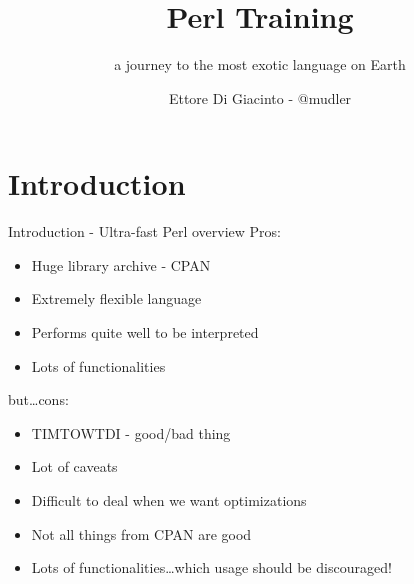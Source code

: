 \documentclass[10pt]{beamer}
\title{Perl Training}
\subtitle{a journey to the most exotic language on Earth}
\date{}
\author{Ettore Di Giacinto - @mudler}
\institute{SUSE/Gentoo/Sabayon}
\begin{document}
\maketitle
\begin{frame}[fragile]
\end{frame}

\section{Introduction}
\begin{frame}[fragile]{Introduction - Ultra-fast Perl overview}
    Pros:
  \begin{itemize}
      \item Huge library archive - CPAN
      \item Extremely flexible language
      \item Performs quite well to be interpreted
      \item Lots of functionalities
  \end{itemize}

  but\ldots cons:

    \begin{itemize}
      \item TIMTOWTDI - good/bad thing
      \item Lot of caveats
      \item Difficult to deal when we want optimizations
      \item Not all things from CPAN are good
      \item Lots of functionalities\ldots which usage should be discouraged!
  \end{itemize}
\end{frame}
\end{document}
